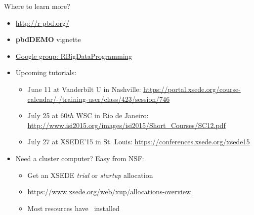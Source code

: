 \begin{frame}
  \begin{block}{Where to learn more?}
  \begin{itemize}
    \item \url{http://r-pbd.org/}
    \item \textbf{pbdDEMO} vignette
    \item \url{Google group: RBigDataProgramming}
    \item Upcoming tutorials:
      \begin{itemize}
      \item June 11 at Vanderbilt U in Nashville:
        \url{https://portal.xsede.org/course-calendar/-/training-user/class/423/session/746}
      \item July 25 at 60$th$ WSC in Rio de Janeiro:
        \url{http://www.isi2015.org/images/isi2015/Short\_Courses/SC12.pdf}
      \item July 27 at XSEDE'15 in St. Louis: \url{https://conferences.xsede.org/xsede15}
      \end{itemize}
    \item Need a cluster computer? Easy from NSF:
      \begin{itemize}
        \item Get an XSEDE {\em trial} or {\em startup} allocation
      \item \url{https://www.xsede.org/web/xup/allocations-overview}
      \item Most resources have \pbdR\ installed
      \end{itemize}
    \end{itemize}
  \end{block}
\end{frame}

